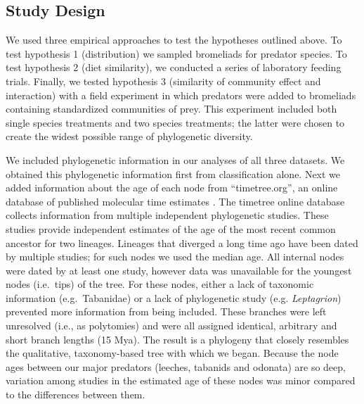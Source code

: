 \documentclass[11pt]{article}
\begin{document}
\subsection*{Study Design}

We used three empirical approaches to test the hypotheses outlined
above. To test hypothesis 1 (distribution) we sampled bromeliads for
predator species. To test hypothesis 2 (diet similarity), we conducted a
series of laboratory feeding trials. Finally, we tested hypothesis 3
(similarity of community effect and interaction) with a field experiment
in which predators were added to bromeliads containing standardized
communities of prey. This experiment included both single species
treatments and two species treatments; the latter were chosen to create
the widest possible range of phylogenetic diversity.

We included phylogenetic information in our analyses of all three
datasets. We obtained this phylogenetic information first from
classification alone. Next we added information about the age of each
node from ``timetree.org'', an online database of published molecular
time estimates \citealt{Hedges2006}. The timetree online database collects
information from multiple independent phylogenetic studies. These
studies provide independent estimates of the age of the most recent
common ancestor for two lineages. Lineages that diverged a long time ago
have been dated by multiple studies; for such nodes we used the median
age. All internal nodes were dated by at least one study, however data
was unavailable for the youngest nodes (i.e.~tips) of the tree. For
these nodes, either a lack of taxonomic information (e.g.~Tabanidae) or
a lack of phylogenetic study (e.g. \emph{Leptagrion}) prevented more
information from being included. These branches were left unresolved
(i.e., as polytomies) and were all assigned identical, arbitrary and
short branch lengths (15 Mya). The result is a phylogeny that closely
resembles the qualitative, taxonomy-based tree with which we began.
Because the node ages between our major predators (leeches, tabanids and
odonata) are so deep, variation among studies in the estimated age of
these nodes was minor compared to the differences between them.
\end{document}
